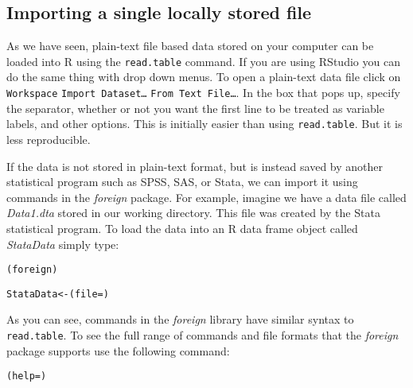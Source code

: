 \subsection{Importing a single locally stored file}

As we have seen, plain-text file based data stored on your computer can be loaded into R using the \texttt{read.table} command. If you are using RStudio you can do the same thing with drop down menus. To open a plain-text data file click on \texttt{Workspace} \textrightarrow\: \texttt{Import Dataset\ldots} \textrightarrow\: \texttt{From Text File\ldots}. In the box that pops up, specify the separator, whether or not you want the first line to be treated as variable labels, and other options. This is initially easier than using \texttt{read.table}. But it is less reproducible.

If the data is not stored in plain-text format, but is instead saved by another statistical program such as SPSS, SAS, or Stata, we can import it using commands in the \emph{foreign} package. For example, imagine we have a data file called \emph{Data1.dta} stored in our working directory. This file was created by the Stata statistical program. To load the data into an R data frame object called \emph{StataData} simply type:

\begin{knitrout}
\color{fgcolor}\begin{kframe}
\begin{alltt}
(foreign)

StataData <- (file = )
\end{alltt}
\end{kframe}
\end{knitrout}


As you can see, commands in the \emph{foreign} library have similar syntax to \texttt{read.table}. To see the full range of commands and file formats that the \emph{foreign} package supports use the following command:

\begin{knitrout}
\color{fgcolor}\begin{kframe}
\begin{alltt}
(help = )
\end{alltt}
\end{kframe}
\end{knitrout}


